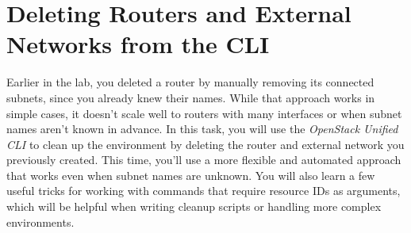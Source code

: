 \documentclass[letterpaper, 12pt]{article}
\begin{document}
\section{Deleting Routers and External Networks from the CLI}\label{sec:deleting_routers_and_external_networks_from_the_cli}
Earlier in the lab, you deleted a router by manually removing its connected subnets, since you already knew their names.
While that approach works in simple cases, it doesn't scale well to routers with many interfaces or when subnet names aren't known in advance.
In this task, you will use the \textit{OpenStack Unified CLI} to clean up the environment by deleting the router and external network you previously created.
This time, you'll use a more flexible and automated approach that works even when subnet names are unknown.
You will also learn a few useful tricks for working with commands that require resource IDs as arguments, which will be helpful when writing cleanup scripts or handling more complex environments.
\end{document}

